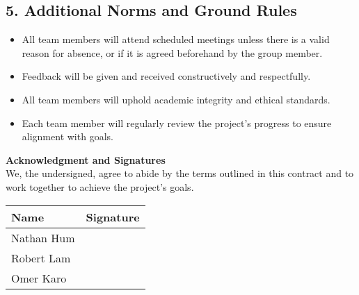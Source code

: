 \documentclass{article}
\begin{document}
\subsection*{5. Additional Norms and Ground Rules}
\begin{itemize}
    \item All team members will attend scheduled meetings unless there is a valid reason for absence, or if it is agreed beforehand by the group member.
    \item Feedback will be given and received constructively and respectfully.
    \item All team members will uphold academic integrity and ethical standards.
    \item Each team member will regularly review the project’s progress to ensure alignment with goals.
\end{itemize}

\vspace{0.5cm}

\noindent\textbf{Acknowledgment and Signatures}\\
We, the undersigned, agree to abide by the terms outlined in this contract and to work together to achieve the project’s goals.

\vspace{1cm}

\begin{tabular}{|p{5cm}|p{5cm}|}
\hline
\textbf{Name} & \textbf{Signature} \\
\hline
Nathan Hum & \hspace{4cm} \\[1cm]
\hline
Robert Lam & \hspace{4cm} \\[1cm]
\hline
Omer Karo & \hspace{4cm} \\[1cm]
\hline
\end{tabular}
\end{document}
